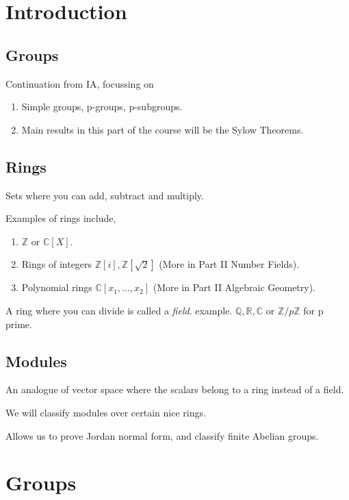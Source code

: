 \section*{Introduction}
\subsection{Groups}
Continuation from IA, focussing on
\begin{enumerate}
    \item Simple groups, p-groups, p-subgroups.
    \item Main results in this part of the course will be the Sylow Theorems.
\end{enumerate}
\subsection{Rings}
Sets where you can add, subtract and multiply.

\begin{example}
    Examples of rings include,
    \begin{enumerate}
        \item \(\mathbb{Z}\) or \(\mathbb{C}[X]\).
        \item Rings of integers \(\mathbb{Z}[i], \mathbb{Z}[\sqrt{2} ]\)  (More in Part II Number Fields).
        \item Polynomial rings \(\mathbb{C}[x_1, \ldots , x_2 ]\) (More in Part II Algebraic Geometry).
    \end{enumerate}
\end{example}

A ring where you can divide is called a \textit{field}.
example. \(\mathbb{Q},\mathbb{R},\mathbb{C}\) or \(\mathbb{Z} / p\mathbb{Z}\) for p prime.

\subsection{Modules}
An analogue of vector space where the scalars belong to a ring instead of a field.

We will classify modules over certain nice rings.

Allows us to prove Jordan normal form, and classify finite Abelian groups.

\section{Groups}
